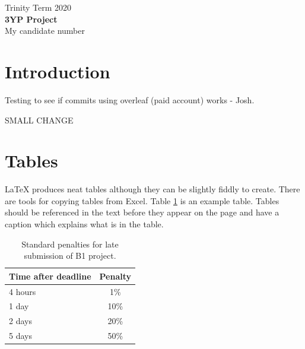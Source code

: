 \documentclass[11pt]{article}
\begin{document}
\begin{center}
\vspace*{2cm}
Trinity Term 2020\\ %
\vspace*{6cm}
 \huge{\textbf{{}3YP Project}}\\ 
\vspace*{6cm}
{\large{My candidate number}} %
\thispagestyle{empty} %


\end{center}

\newpage

\setcounter{page}{1}

\section{Introduction}
Testing to see if commits using overleaf (paid account) works - Josh.

SMALL CHANGE





\section{Tables}

\LaTeX{} produces neat tables although they can be slightly fiddly to create. There are tools for copying tables from Excel. Table \ref{tab:latesubpen} is an example table. Tables should be referenced in the text before they appear on the page and have a caption which explains what is in the table.
\begin{table}[h] %
\begin{center}
\begin{tabular}{ |l|c| } 
 \hline
  Time after deadline & Penalty  \\ 
  \hline
 4 hours & 1\%  \\ 
 1 day & 10\%  \\ 
 2 days & 20\%  \\ 
 5 days & 50\%\\
 \hline
\end{tabular}
\end{center}
\label{tab:latesubpen}
\caption{Standard penalties for late submission of B1 project.}
\end{table}
\end{document}
